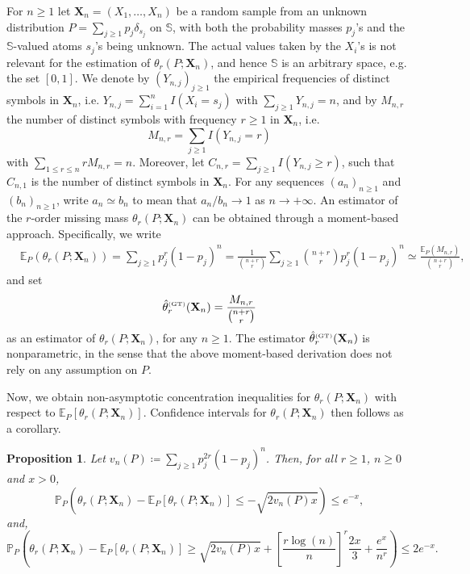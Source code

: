 \documentclass{article}
\newtheorem{proposition}{Proposition}
\newcommand{\1}{\boldsymbol{1}}
\newcommand{\EE}{\mathbb{E}}
\newcommand{\PP}{\mathbb{P}}
\theoremstyle{plain}
\begin{document}
For $n\geq1$ let $\mathbf{X}_{n}=(X_{1},\ldots,X_{n})$ be a random sample from an unknown distribution $P=\sum_{j\geq1}p_{j}\delta_{s_{j}}$ on $\mathbb{S}$, with both the probability masses $p_{j}$'s and the $\mathbb{S}$-valued atoms $s_{j}$'s being unknown. The actual values taken by the $X_{i}$'s is not relevant for the estimation of $\theta_{r}(P;\mathbf{X}_{n})$, and hence $\mathbb{S}$ is an arbitrary space, e.g. the set $[0,1]$. We denote by $(Y_{n,j})_{j\geq1}$ the empirical frequencies of distinct symbols in $\mathbf{X}_{n}$, i.e. $Y_{n,j}=\sum_{i=1}^{n}I(X_{i}=s_{j})$ with $\sum_{j\geq1}Y_{n,j}=n$, and by $M_{n,r}$ the number of distinct symbols with frequency $r\geq1$ in $\mathbf{X}_{n}$, i.e. 
\begin{displaymath}
M_{n,r}=\sum_{j\geq1}I(Y_{n,j}=r)
\end{displaymath}
with $\sum_{1\leq r\leq n}rM_{n,r}=n$. Moreover, let $C_{n,r}=\sum_{j\geq1}I(Y_{n,j}\geq r)$, such that $C_{n,1}$ is  the number of distinct symbols in $\mathbf{X}_{n}$. For any sequences $(a_n)_{n \geq 1}$ and $(b_n)_{n \geq 1}$, write $a_n\simeq b_n$ to mean that $a_{n}/b_{n}\rightarrow1$ as $n\rightarrow+\infty$. An estimator of the $r$-order missing mass $\theta_{r}(P;\mathbf{X}_{n})$ can be obtained through a moment-based approach. Specifically, we write
\begin{align*}
&\mathbb{E}_{P}(\theta_{r}(P;\mathbf{X}_{n}))= \sum_{j \geq 1} p_j^{r}(1-p_j)^{n}=\frac{1}{{n+r \choose r}} \sum_{j \geq 1} {n+r \choose r} p_j^{r}(1-p_j)^{n}\simeq \frac{\mathbb{E}_{P} (M_{n,r})}{{n+r\choose r}},
\end{align*}
and set
\begin{displaymath}
\hat{\theta}_{r}^{\text{\tiny{(GT)}}}(\mathbf{X}_{n})=\frac{M_{n,r}}{{n+r\choose r}}
\end{displaymath}
as an estimator of $\theta_{r}(P;\mathbf{X}_{n})$, for any $n\geq1$. The estimator $\hat{\theta}_{r}^{\text{\tiny{(GT)}}}(\mathbf{X}_{n})$ is nonparametric, in the sense that the above moment-based derivation does not rely on any assumption on $P$.

Now, we obtain non-asymptotic concentration inequalities for $\theta_r(P;\mathbf{X}_{n})$ with respect to $\mathbb{E}_{P}[\theta_r(P;\mathbf{X}_{n})]$. Confidence intervals for $\theta_r(P;\mathbf{X}_{n})$ then follows as a corollary.

\begin{proposition}\label{pro:7}
  Let $v_n(P) \coloneqq \sum_{j\geq 1}p_j^{2r}(1-p_j)^n$. Then, for all $r \geq 1$, $n\geq 0$ and $x > 0$,
  \begin{equation}
    \label{eq:35}
    \PP_P\left( \theta_r(P;\mathbf{X}_n) - \EE_P[\theta_r(P;\mathbf{X}_n)] \leq - \sqrt{2v_n(P)x} \right)%
    \leq e^{-x},
  \end{equation}
  and,
  \begin{equation}
    \label{eq:33}
    \PP_P\left( \theta_r(P;\mathbf{X}_n) - \EE_P[\theta_r(P;\mathbf{X}_n)] \geq \sqrt{2v_n(P)x} + \left[\frac{r \log(n)}{n} \right]^r \frac{2x}{3} + \frac{e^{x}}{n^r} \right)%
    \leq%
    2e^{-x}.
  \end{equation}
\end{proposition}
\end{document}
